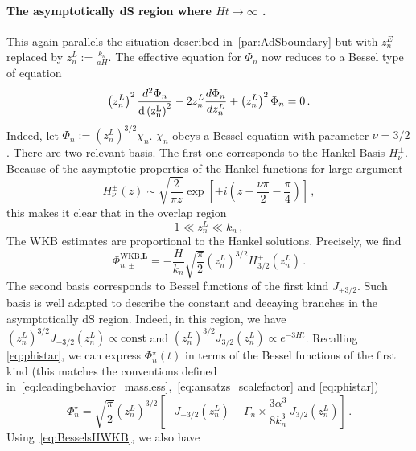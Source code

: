 \documentclass[a4paper,11pt]{article}
\begin{document}
\paragraph{The asymptotically dS region where $H t \to \infty$ .}
This again parallels the situation described in~\ref{par:AdSboundary} but with $z_n^E$ replaced by $z_n^L := \frac{k_n}{a H}$. The effective equation for $\Phi_n$ now reduces to a Bessel type of equation
\begin{equation}
     \left(z_n^{L}\right)^2\frac{d^2\Phi_n}{\rm{d}\left(z_n^{L}\right)^2} -2z_n^{L}\frac{d\Phi_n}{dz_n^{L}}+\left(z_n^{L}\right)^2 \Phi_n =0\,.
\end{equation}
Indeed, let $\Phi_n := \left(z_n^{L}\right)^{3/2}\chi_n$. $\chi_n$ obeys a Bessel equation with parameter $\nu = 3/2$. There are two relevant basis. The first one corresponds to the Hankel Basis $H^{\pm}_\nu$. Because of the asymptotic properties of the Hankel functions for large argument 
\begin{equation}
    H_\nu^\pm(z) \sim \sqrt{\frac{2}{\pi z}} \exp\left[\pm i\left(z-\frac{\nu \pi}{2} -\frac{\pi}{4}\right)\right]\,,
\end{equation}
this makes it clear that in the overlap region
\begin{equation}
    1 \ll z_n^L \ll k_n\,,
\end{equation}
The WKB estimates are proportional to the Hankel solutions. Precisely, we find
\begin{equation}\label{eq:BesselsHWKB}
    \Phi^{\text{WKB},\textbf{L}}_{n,\pm} = -\frac{H}{k_n}\sqrt{\frac{\pi}{2}} \left(z_n^L\right)^{3/2}H^{\pm}_{3/2}(z_n^L)\,.
\end{equation}
The second basis corresponds to Bessel functions of the first kind $J_{\pm3/2}$. Such basis is well adapted to describe the constant and decaying branches in the asymptotically dS region. Indeed, in this region, we have $(z_n^L)^{3/2}J_{-3/2}(z_n^L) \propto \text{const}$ and $(z_n^L)^{3/2}J_{3/2}(z_n^L)\propto e^{-3 H t}$. Recalling \eqref{eq:phistar}, we can express $\Phi_n^\star(t)$ in terms of the Bessel functions of the first kind (this matches the conventions defined in~\eqref{eq:leadingbehavior_massless},~\eqref{eq:ansatzs_scalefactor} and \eqref{eq:phistar})
\begin{equation}
    \Phi_n^\star = \sqrt{\frac{\pi}{2}}\left(z_n^L\right)^{3/2}\left[ -J_{-3/2}(z_n^L)+ \Gamma_n \times \frac{3\alpha^3}{8k_n^3}\,J_{3/2}(z_n^L)\right]\,.
\end{equation}
Using~\eqref{eq:BesselsHWKB}, we also have
\end{document}
